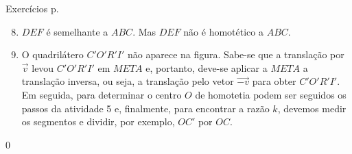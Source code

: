 \begin{answer}{Exercícios p. \pageref{transformacoes-exercise5}}
{\exerciselist
\begin{enumerate}\setcounter{enumi}{7}
\item $DEF$ é semelhante a $ABC$. Mas $DEF$ não é homotético a $ABC$.

\item O quadrilátero $C'O'R'I'$ não aparece na figura. Sabe-se que a translação por $\overrightarrow{v}$ levou $C'O'R'I'$ em $META$ e, portanto, deve-se aplicar a $META$ a translação inversa, ou seja, a translação pelo vetor $\overrightarrow{-v}$ para obter $C'O'R'I'$. Em seguida, para determinar o centro $O$ de homotetia podem ser seguidos os passos da atividade 5 e, finalmente, para encontrar a razão $k$, devemos medir os segmentos e dividir, por exemplo, $OC'$ por $OC$.
\end{enumerate}
}{0}
\end{answer}

